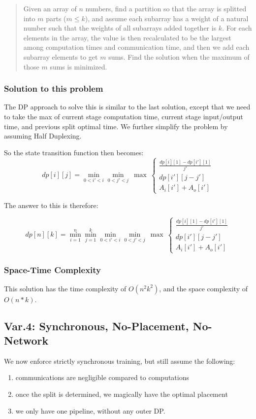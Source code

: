 \documentclass[12pt,letterpaper]{article}
\begin{document}
\begin{quote}
	Given an array of $n$ numbers, find a partition so that the array is splitted into $m$ parts ($m \le k$), and assume each subarray has a weight of a natural number such that the weights of all subarrays added together is $k$. For each elements in the array, the value is then recalculated to be the largest among computation times and communication time, and then we add each subarray elements to get $m$ sums. Find the solution when the maximum of those $m$ sums is minimized.
\end{quote}

\subsubsection{Solution to this problem}
The DP approach to solve this is similar to the last solution, except that we need to take the max of current stage computation time, current stage input/output time, and previous split optimal time. We further simplify the problem by assuming Half Duplexing.

So the state transition function then becomes:
$$dp[i][j] = \min_{0<i'<i}\min_{0<j'<j}\ \max\ \left\{\begin{array}{lr}
        	\frac{dp[i][1] - dp[i'][1]}{j'} \\
        	dp[i'][j-j'] \\
        	A_i[i'] + A_o[i']
        \end{array} \right .$$
        
The answer to this is therefore:

$$dp[n][k] = \min_{i=1}^n\min_{j=1}^k\min_{0<i'<i}\min_{0<j'<j}\ \max\ \left\{\begin{array}{lr}
        	\frac{dp[i][1] - dp[i'][1]}{j'} \\
        	dp[i'][j-j'] \\
        	A_i[i'] + A_o[i']
        \end{array} \right .$$
        
\subsubsection{Space-Time Complexity}
This solution has the time complexity of $O(n^2k^2)$, and the space complexity of $O(n * k)$.

\subsection{Var.4: Synchronous, No-Placement, No-Network}
We now enforce strictly synchronous training, but still assume the following:
\begin{enumerate}
	\item communications are negligible compared to computations
	\item once the split is determined, we magically have the optimal placement
	\item we only have one pipeline, without any outer DP.
\end{enumerate}
\end{document}
